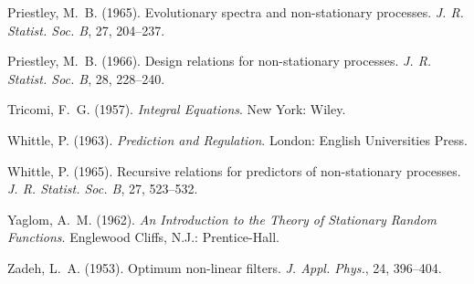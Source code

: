 \documentclass[11pt]{article}
\begin{document}
\begin{thebibliography}{99}
Priestley, M.~B. (1965). Evolutionary spectra and non-stationary processes. \emph{J. R. Statist. Soc. B}, 27, 204--237.

Priestley, M.~B. (1966). Design relations for non-stationary processes. \emph{J. R. Statist. Soc. B}, 28, 228--240.

Tricomi, F.~G. (1957). \emph{Integral Equations}. New York: Wiley.

Whittle, P. (1963). \emph{Prediction and Regulation}. London: English Universities Press.

Whittle, P. (1965). Recursive relations for predictors of non-stationary processes. \emph{J. R. Statist. Soc. B}, 27, 523--532.

Yaglom, A.~M. (1962). \emph{An Introduction to the Theory of Stationary Random Functions}. Englewood Cliffs, N.J.: Prentice-Hall.

Zadeh, L.~A. (1953). Optimum non-linear filters. \emph{J. Appl. Phys.}, 24, 396--404.
\end{thebibliography}
\end{document}
